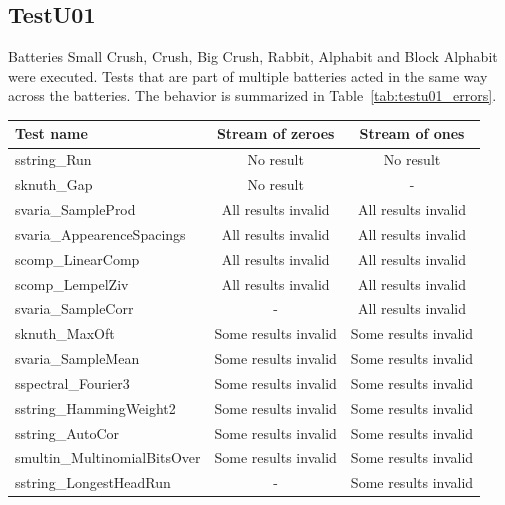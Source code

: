 \documentclass[
  digital,  	%
  color,		%
  oneside,   	%
  12pt,
  nocover,
  notable,
  nolof,
  nolot,
]{fithesis3}
\begin{document}
\subsection*{TestU01}
Batteries Small Crush, Crush, Big Crush, Rabbit, Alphabit and Block Alphabit were executed. Tests that are part of multiple batteries acted in the same way across the batteries. The behavior is summarized in Table~\ref{tab:testu01_errors}.

\begin{table}[h!]
\begin{nomar}
\centering
\begin{tabular}{l || c | c }
\textbf{Test name}                 & \textbf{Stream of zeroes} & \textbf{Stream of ones} \\ \hline \hline    
sstring\_Run                       & No result                & No result                \\
sknuth\_Gap                        & No result                & -                        \\ \hline
svaria\_SampleProd                 & All results invalid      & All results invalid      \\
svaria\_AppearenceSpacings         & All results invalid      & All results invalid      \\   
scomp\_LinearComp                  & All results invalid      & All results invalid      \\
scomp\_LempelZiv                   & All results invalid      & All results invalid      \\
svaria\_SampleCorr                 & -                        & All results invalid      \\ \hline
sknuth\_MaxOft                     & Some results invalid     & Some results invalid     \\
svaria\_SampleMean                 & Some results invalid     & Some results invalid     \\
sspectral\_Fourier3                & Some results invalid     & Some results invalid     \\
sstring\_HammingWeight2            & Some results invalid     & Some results invalid     \\
sstring\_AutoCor                   & Some results invalid     & Some results invalid     \\
smultin\_MultinomialBitsOver       & Some results invalid     & Some results invalid     \\
sstring\_LongestHeadRun            & -                        & Some results invalid     \\ \hline

\end{tabular}
\end{nomar}
\end{table}
\end{document}
